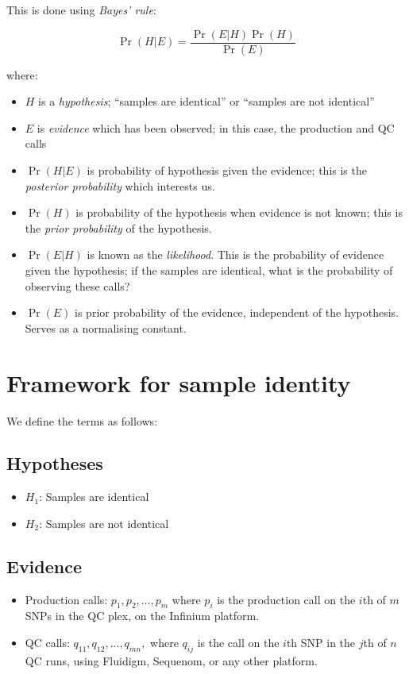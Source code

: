 \documentclass{article}
\begin{document}
This is done using \emph{Bayes' rule}:

\begin{displaymath}
\Pr(H|E) = \frac{\Pr(E|H)\Pr(H)}{\Pr(E)}
\end{displaymath}

where:

\begin{itemize}
\item $H$ is a \emph{hypothesis}; ``samples are identical'' or ``samples are not identical''
\item $E$ is \emph{evidence} which has been observed; in this case, the production and QC calls
\item $\Pr(H|E)$ is probability of hypothesis given the evidence; this is the \emph{posterior probability} which interests us.
\item $\Pr(H)$ is probability of the hypothesis when evidence is not known; this is the \emph{prior probability} of the hypothesis.
\item $\Pr(E|H)$ is known as the \emph{likelihood}. This is the probability of evidence given the hypothesis; if the samples are identical, what is the probability of observing these calls?
\item $\Pr(E)$ is prior probability of the evidence, independent of the hypothesis. Serves as a normalising constant.
\end{itemize}


\section{Framework for sample identity}

We define the terms as follows:


\subsection*{Hypotheses}

\begin{itemize}
\item $H_1$: Samples are identical
\item $H_2$: Samples are not identical
\end{itemize}


\subsection*{Evidence}

\begin{itemize}
\item Production calls: $p_1, p_2, \dots , p_m$ where $p_i$ is the production call on the $i$th of $m$ SNPs in the QC plex, on the Infinium platform.
\item QC calls: $q_{11}, q_{12}, \dots , q_{mn},$ where $q_{ij}$ is the call on the $i$th SNP in the $j$th of $n$ QC runs, using Fluidigm, Sequenom, or any other platform.
\end{itemize}
\end{document}
